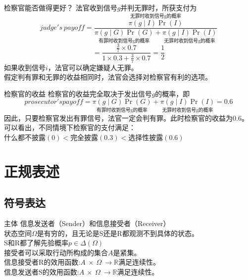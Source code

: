 \documentclass{beamer}
\begin{document}
\begin{frame}{检察官能否做得更好？}
	法官收到信号$g$并判无罪时，所获支付为
	$$judge's \ payoff=\frac{\overset{\text{无罪时收到信号g的概率}}{\pi\left( g \mid I\right) \Pr\left( I\right)} }{\underset{\text{有罪时收到信号g的概率}}{\pi\left( g \mid G\right) \Pr\left( G\right)}+\underset{\text{无罪时收到信号g的概率}}{\pi\left( g \mid I\right) \Pr\left( I\right)}}$$\pause
	$$=\frac{\frac{3}{7}\times 0.7}{1\times 0.3+\frac{3}{7}\times 0.7}=\frac{1}{2}$$\pause
	如果收到信号$i$，法官可以确定嫌疑人无罪。\pause\\
	\alert{假定判有罪和无罪的收益相同时，法官会选择对检察官有利的选项}。
\end{frame}

\begin{frame}{检察官的收益}
	检察官的收益完全取决于发出信号$g$的概率，即
	$$prosecutor's payoff=\underset{\text{有罪时收到信号g的概率}}{\pi\left( g \mid G\right) \Pr\left( G\right)}+\underset{\text{无罪时收到信号g的概率}}{\pi\left( g \mid I\right) \Pr\left( I\right)}=0.6$$
	因此，只要检察官发出有罪信号，法官一定会判有罪。此时检察官的收益为0.6。\pause\\
	可以看出，不同情境下检察官的支付满足：\\
	什么都不披露$\left(0\right)<$完全披露$\left( 0.3\right) <$选择性披露$ \left( 0.6\right) $ 
\end{frame}

\section{正规表述}

\subsection{符号表达}

\begin{frame}{主体}
	信息发送者（Sender）和信息接受者（Receiver）\\
	状态空间$\Omega$是有穷的，且无论是S还是R都观测不到具体的状态。\\
	S和R都了解先验概率$p\in\Delta\left( \Omega \right) $\\
	接受者可以采取行动所构成的集合$A$是紧集。\\
	信息接受者R的效用函数:$A\ \times \ \Omega \ \to \mathbb{R}$满足连续性。\\
	信息发送者S的效用函数:$A\ \times \ \Omega \ \to \mathbb{R}$满足连续性。
\end{frame}
\end{document}
